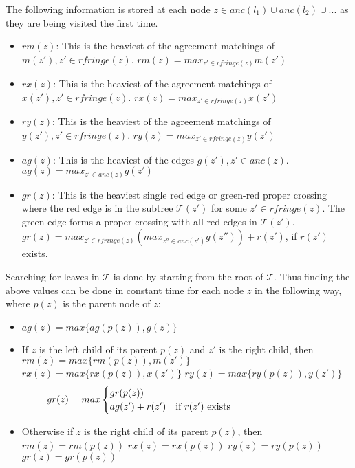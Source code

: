 The following information is stored at each node $z \in {anc(l_1) \cup anc(l_2) \cup ... }$ as they are being visited the first time.

\begin{itemize}
	\item $rm(z)$: This is the heaviest of the agreement matchings of $m(z'), z' \in rfringe(z)$.
		\subitem $rm(z) = max_{z'\in rfringe(z)} m(z')$
	\item $rx(z)$: This is the heaviest of the agreement matchings of $x(z'), z' \in rfringe(z)$.
		\subitem $rx(z) = max_{z'\in rfringe(z)} x(z')$
	\item $ry(z)$: This is the heaviest of the agreement matchings of $y(z'), z' \in rfringe(z)$.
		\subitem $ry(z) = max_{z'\in rfringe(z)} y(z')$
	\item $ag(z)$: This is the heaviest of the edges $g(z'), z' \in anc(z)$.
		\subitem $ag(z) = max_{z'\in anc(z)} g(z')$
	\item $gr(z)$: This is the heaviest single red edge or green-red proper crossing where the red edge is in the subtree $\mathcal{T}(z')$ for some $z' \in rfringe(z)$. The green edge forms a proper crossing with all red edges in $\mathcal{T}(z')$.
		\subitem $gr(z) = max_{z'\in rfringe(z)} (max_{z''\in anc(z')} g(z'')) + r(z')$, if $r(z')$ exists.
\end{itemize}

Searching for leaves in $\mathcal{T}$ is done by starting from the root of $\mathcal{T}$. Thus finding the above values can be done in constant time for each node $z$ in the following way, where $p(z)$ is the parent node of $z$:
\begin{itemize}
	\item $ag(z) = max\{ag(p(z)), g(z)\}$
	\item If $z$ is the left child of its parent $p(z)$ and $z'$ is the right child, then
		\subitem $rm(z) = max\{rm(p(z)), m(z')\}$
		\subitem $rx(z) = max\{rx(p(z)), x(z')\}$
		\subitem $ry(z) = max\{ry(p(z)), y(z')\}$
		\begin{equation*}
		\begin{aligned} gr(z)=max
		\begin{cases}
		gr(p(z))
		\\
		ag(z') + r(z') & \text{if $r(z')$ exists}             
		\end{cases}
		\end{aligned}
		\phantom{\hspace{3.5cm}}
		\end{equation*}
	\item Otherwise if $z$ is the right child of its parent $p(z)$, then
	\subitem $rm(z) = rm(p(z))$
	\subitem $rx(z) = rx(p(z))$
	\subitem $ry(z) = ry(p(z))$
	\subitem $gr(z) = gr(p(z))$
\end{itemize}

